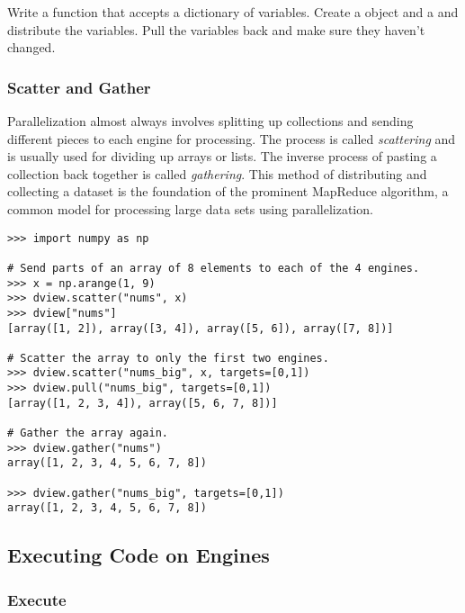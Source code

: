 \begin{problem}
Write a function  that accepts a dictionary of variables.
Create a  object and a  and distribute the variables.
Pull the variables back and make sure they haven't changed.
\end{problem}

\subsubsection*{Scatter and Gather} %

Parallelization almost always involves splitting up collections and sending different pieces to each engine for processing.
The process is called \emph{scattering} and is usually used for dividing up arrays or lists.
The inverse process of pasting a collection back together is called \emph{gathering}.
This method of distributing and collecting a dataset is the foundation of the prominent MapReduce algorithm, a common model for processing large data sets using parallelization.

\begin{lstlisting}
>>> import numpy as np

# Send parts of an array of 8 elements to each of the 4 engines.
>>> x = np.arange(1, 9)
>>> dview.scatter("nums", x)
>>> dview["nums"]
[array([1, 2]), array([3, 4]), array([5, 6]), array([7, 8])]

# Scatter the array to only the first two engines.
>>> dview.scatter("nums_big", x, targets=[0,1])
>>> dview.pull("nums_big", targets=[0,1])
[array([1, 2, 3, 4]), array([5, 6, 7, 8])]

# Gather the array again.
>>> dview.gather("nums")
array([1, 2, 3, 4, 5, 6, 7, 8])

>>> dview.gather("nums_big", targets=[0,1])
array([1, 2, 3, 4, 5, 6, 7, 8])
\end{lstlisting}

\subsection*{Executing Code on Engines} %


\subsubsection*{Execute} %

